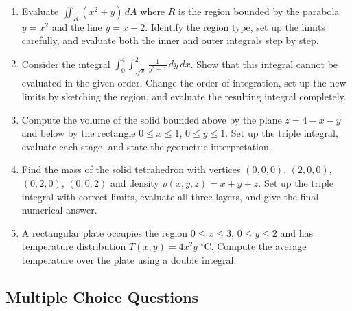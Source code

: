 \documentclass[12pt,a4paper]{article}
\begin{document}
\begin{enumerate}
  \item Evaluate \(\displaystyle\iint_R (x^2+y)\,dA\) where \(R\) is the region bounded by the parabola \(y = x^2\) and the line \(y = x+2\). Identify the region type, set up the limits carefully, and evaluate both the inner and outer integrals step by step.

  \item Consider the integral \(\displaystyle\int_0^4\int_{\sqrt{x}}^{2} \frac{1}{y^3+1}\,dy\,dx\). Show that this integral cannot be evaluated in the given order. Change the order of integration, set up the new limits by sketching the region, and evaluate the resulting integral completely.

  \item Compute the volume of the solid bounded above by the plane \(z = 4 - x - y\) and below by the rectangle \(0\le x\le 1\), \(0\le y\le 1\). Set up the triple integral, evaluate each stage, and state the geometric interpretation.

  \item Find the mass of the solid tetrahedron with vertices \((0,0,0)\), \((2,0,0)\), \((0,2,0)\), \((0,0,2)\) and density \(\rho(x,y,z) = x+y+z\). Set up the triple integral with correct limits, evaluate all three layers, and give the final numerical answer.

  \item A rectangular plate occupies the region \(0 \le x \le 3\), \(0 \le y \le 2\) and has temperature distribution \(T(x,y) = 4x^2y\) \(^{\circ}\)C. Compute the average temperature over the plate using a double integral.
\end{enumerate}

\subsection*{Multiple Choice Questions}
\end{document}
